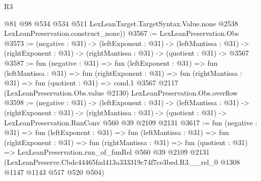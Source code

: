 \begin{lexlean}{R3}
\begin{coremodule}
        @81
        @98
        @534
        @534
        @511
        LexLeanTarget.TargetSyntax.Value.none
        @2538
        LexLeanPreservation.construct_none))
@3567 := LexLeanPreservation.Obs
@3573 := (negative : @31) ->
  (leftExponent : @31) ->
  (leftMantissa : @31) ->
  (rightExponent : @31) -> (rightMantissa : @31) -> (quotient : @31) -> @3567
@3587 := fun (negative : @31) =>
  fun (leftExponent : @31) =>
  fun (leftMantissa : @31) =>
  fun (rightExponent : @31) =>
  fun (rightMantissa : @31) =>
  fun (quotient : @31) =>
  cond.{1} @3567 @2117 (LexLeanPreservation.Obs.value @2130) LexLeanPreservation.Obs.overflow
@3598 := (negative : @31) ->
  (leftExponent : @31) ->
  (leftMantissa : @31) ->
  (rightExponent : @31) ->
  (rightMantissa : @31) -> (quotient : @31) -> LexLeanPreservation.RunConv @560 @39 @2109 @2131
@3617 := fun (negative : @31) =>
  fun (leftExponent : @31) =>
  fun (leftMantissa : @31) =>
  fun (rightExponent : @31) =>
  fun (rightMantissa : @31) =>
  fun (quotient : @31) =>
  LexLeanPreservation.run_of_funRel
    @560
    @39
    @2109
    @2131
    (LexLeanPreserve.Cbdc44465fad413a333319c74f7ce3bed.R3.__rel_0 @1308 @1147 @1143 @517 @520 @504)
\end{coremodule}
\end{lexlean}
